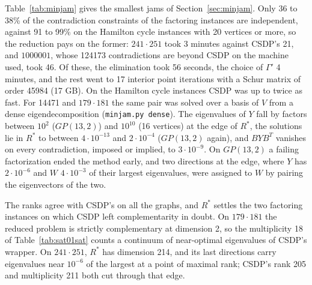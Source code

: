 \documentclass[11pt]{article}
\theoremstyle{definition}
\theoremstyle{remark}
\begin{document}
Table~\ref{tab:minjam} gives the smallest jams of Section~\ref{sec:minjam}.
Only 36 to 38\% of the contradiction constraints of the factoring instances
are independent, against 91 to 99\% on the Hamilton cycle instances with 20
vertices or more, so the reduction pays on the former: $241\cdot251$ took 3
minutes against CSDP's 21, and $1000001$, whose 124173 contradictions are
beyond CSDP on the machine used, took 46. Of these, the elimination took 56
seconds, the choice of $\Gamma'$ 4 minutes, and the rest went to 17 interior
point iterations with a Schur matrix of order 45984 (17 GB). On the
Hamilton cycle instances CSDP was up to twice as fast. For 14471 and
$179\cdot181$ the same pair was solved over a basis of $V$ from a dense
eigendecomposition (\texttt{minjam.py dense}). The eigenvalues of $Y$ fall by factors between $10^2$
($GP(13,2)$) and $10^{10}$ (16 vertices) at the edge of $R^*$, the
solutions lie in $R^*$ to between $4\cdot10^{-13}$ and $2\cdot10^{-4}$
($GP(13,2)$ again), and $BYB^T$ vanishes on every contradiction, imposed or
implied, to $3\cdot10^{-9}$. On $GP(13,2)$ a failing factorization ended
the method early, and two directions at the edge, where $Y$ has
$2\cdot10^{-6}$ and $W$ $4\cdot10^{-3}$ of their largest eigenvalues, were
assigned to $W$ by pairing the eigenvectors of the two.

The ranks agree with CSDP's on all the graphs, and $R^*$ settles the two
factoring instances on which CSDP left complementarity in doubt. On
$179\cdot181$ the reduced problem is strictly complementary at dimension 2,
so the multiplicity 18 of Table~\ref{tab:sat01sat} counts a continuum of
near-optimal eigenvalues of CSDP's wrapper. On $241\cdot251$, $R^*$ has
dimension 214, and its last directions carry eigenvalues near $10^{-6}$ of
the largest at a point of maximal rank; CSDP's rank 205 and multiplicity
211 both cut through that edge.
\end{document}
